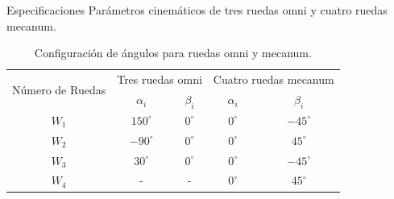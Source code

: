 \documentclass[10pt,aspectratio=169]{beamer}
\begin{document}
\begin{frame}{Especificaciones}
  Parámetros cinemáticos de tres ruedas omni y cuatro ruedas mecanum.
  
  \begin{table}[htbp]
      \centering
      \renewcommand{\arraystretch}{1.2}
      \begin{tabular}{|c|c|c|c|c|}
      \hline
      \multirow{2}{*}{Número de Ruedas} & \multicolumn{2}{c|}{Tres ruedas omni} & \multicolumn{2}{c|}{Cuatro ruedas mecanum} \\
      \cline{2-5}
       & $\alpha_i$ & $\beta_i$ & $\alpha_i$ & $\beta_i$ \\
      \hline
      $W_1$ & $150^{\circ}$ & $0^{\circ}$ & $0^{\circ}$ & $-45^{\circ}$ \\
      \hline
      $W_2$ & $-90^{\circ}$ & $0^{\circ}$ & $0^{\circ}$ & $45^{\circ}$ \\
      \hline
      $W_3$ & $30^{\circ}$ & $0^{\circ}$ & $0^{\circ}$ & $-45^{\circ}$ \\
      \hline
      $W_4$ & - & - & $0^{\circ}$ & $45^{\circ}$ \\
      \hline
      \end{tabular}
      \caption{Configuración de ángulos para ruedas omni y mecanum.}
      \label{tabla:ruedas}
  \end{table}
\end{frame}
\end{document}
